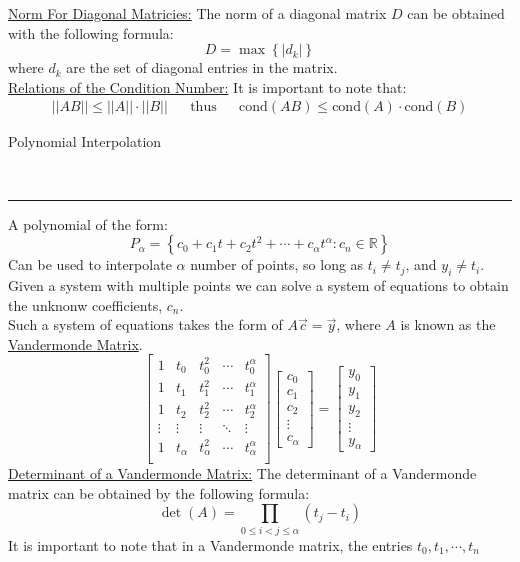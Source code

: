 \documentclass{article}
\newcommand{\header}[1]{\begin{large}\noindent #1\end{large}\\\rule{\textwidth}{0.5pt}}
\newcommand{\gap}{\medskip\\}
\begin{document}
\underline{Norm For Diagonal Matricies:} The norm of a diagonal matrix $D$ can be obtained
with the following formula:
\[
    D = \max\left\{|d_k|\right\}
\]
where $d_k$ are the set of diagonal entries in the matrix.
\gap
\underline{Relations of the Condition Number:} It is important to note that:
\begin{align*}
    ||AB|| \leq ||A||\cdot||B|| && \textrm{thus} && \textrm{cond}(AB) \leq \textrm{cond}(A) \cdot \textrm{cond}(B)
\end{align*}

\header{Polynomial Interpolation}
A polynomial of the form:
\[
    P_\alpha = \left\{ c_0 + c_1t + c_2t^2 + \cdots + c_\alpha t^\alpha : c_n \in \mathbb{R}\right\}  
\]
Can be used to interpolate $\alpha$ number of points, so long as $t_i \neq t_j$, and $y_i \neq t_i$.
\gap
Given a system with multiple points we can solve a system of equations to obtain the 
unknonw coefficients, $c_n$.
\gap
Such a system of equations takes the form of $A\vec{c} = \vec{y}$, where $A$ is
known as the \underline{Vandermonde Matrix}.
\[
    \begin{bmatrix}
        1 & t_0 & t_0^2 & \cdots & t_0^\alpha\\
        1 & t_1 & t_1^2 & \cdots & t_1^\alpha\\
        1 & t_2 & t_2^2 & \cdots & t_2^\alpha\\
        \vdots & \vdots & \vdots & \ddots & \vdots\\
        1 & t_\alpha & t_\alpha^2 & \cdots & t_\alpha^\alpha\\
    \end{bmatrix}  
    \begin{bmatrix}
        c_0\\
        c_1\\
        c_2\\
        \vdots\\
        c_\alpha
    \end{bmatrix}
    =
    \begin{bmatrix}
        y_0\\
        y_1\\
        y_2\\
        \vdots\\
        y_\alpha
    \end{bmatrix}
\]
\underline{Determinant of a Vandermonde Matrix:} The determinant of a Vandermonde matrix
can be obtained by the following formula:
\[
    \det(A) = \prod_{0 \leq i < j \leq \alpha}(t_j - t_i)    
\]
It is important to note that in a Vandermonde matrix, the entries $t_0, t_1, \cdots, t_n$
\end{document}
